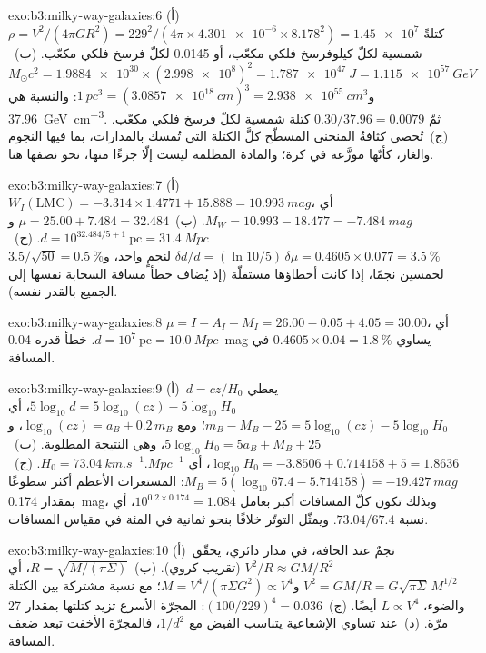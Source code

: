 \begin{solution}{exo:b3:milky-way-galaxies:6}
(أ)~$\rho = V^2/(4\pi GR^2) = 229^2/(4\pi\times\num{4.301e-6}\times
8.178^2) = \num{1.45e7}$ كتلةً شمسية لكلّ كيلوفرسخ فلكي مكعّب، أو
\num{0.0145} لكلّ فرسخ فلكي مكعّب. (ب)~$M_\odot c^2 = \num{1.9884e30}\times
(\num{2.998e8})^2 = \qty{1.787e47}{J} = \qty{1.115e57}{GeV}$
و$\qty{1}{pc^3} = (\qty{3.0857e18}{cm})^3 = \qty{2.938e55}{cm^3}$: والنسبة هي
\qty{37.96}{GeV.cm^{-3}}. ثمّ $0.30/37.96 = \num{0.0079}$ كتلة شمسية
لكلّ فرسخ فلكي مكعّب. (ج)~تُحصي كثافةُ المنحنى المسطّح كلَّ الكتلة التي تُمسك
بالمدارات، بما فيها النجوم والغاز، كأنّها موزَّعة في كرة؛
والمادة المظلمة ليست إلّا جزءًا منها، نحو نصفها هنا.
\end{solution}

\begin{solution}{exo:b3:milky-way-galaxies:7}
(أ)~$W_I(\mathrm{LMC}) = -3.314\times1.4771 + 15.888 = \qty{10.993}{mag}$،
أي $M_W = 10.993 - 18.477 = \qty{-7.484}{mag}$. (ب)~$\mu = 25.00 + 7.484 =
32.484$ و$d = 10^{32.484/5 + 1}~\mathrm{pc} = \qty{31.4}{Mpc}$.
(ج)~$\delta d/d = (\ln 10/5)\,\delta\mu = 0.4605\times0.077 =
\qty{3.5}{\percent}$ لنجمٍ واحد، و$3.5/\sqrt{50} = \qty{0.5}{\percent}$
لخمسين نجمًا، إذا كانت أخطاؤها مستقلّة (إذ يُضاف خطأ مسافة السحابة نفسها
إلى الجميع بالقدر نفسه).
\end{solution}

\begin{solution}{exo:b3:milky-way-galaxies:8}
$\mu = I - A_I - M_I = 26.00 - 0.05 + 4.05 = 30.00$، أي $d =
10^{7}~\mathrm{pc} = \qty{10.0}{Mpc}$. خطأ قدره \qty{0.04}{mag} يساوي
$0.4605\times0.04 = \qty{1.8}{\percent}$ في المسافة.
\end{solution}

\begin{solution}{exo:b3:milky-way-galaxies:9}
(أ)~$d = cz/H_0$ يعطي $5\log_{10}d = 5\log_{10}(cz) - 5\log_{10}H_0$،
أي $m_B - M_B - 25 = 5\log_{10}(cz) - 5\log_{10}H_0$؛ ومع
$\log_{10}(cz) = a_B + 0.2\,m_B$، و$5\log_{10}H_0 = 5a_B + M_B + 25$، وهي
النتيجة المطلوبة. (ب)~$\log_{10}H_0 = -3.8506 + 0.714158 + 5 = 1.8636$، أي
$H_0 = \qty{73.04}{km.s^{-1}.Mpc^{-1}}$. (ج)~$M_B = 5(\log_{10}67.4 -
5.714158) = \qty{-19.427}{mag}$: المستعرات الأعظم أكثر سطوعًا بمقدار \qty{0.174}{mag}،
وبذلك تكون كلّ المسافات أكبر بعامل $10^{0.2\times0.174} = 1.084$، أي
نسبة $73.04/67.4$. ويمثّل التوتّر خلافًا بنحو ثمانية في المئة في
مقياس المسافات.
\end{solution}

\begin{solution}{exo:b3:milky-way-galaxies:10}
(أ)~نجمٌ عند الحافة، في مدار دائري، يحقّق $V^2/R \approx GM/R^2$
(تقريب كروي). (ب)~$R = \sqrt{M/(\pi\Sigma)}$، أي $V^2 =
GM/R = G\sqrt{\pi\Sigma}\,M^{1/2}$ و$M = V^4/(\pi\Sigma G^2) \propto
V^4$؛ مع نسبة مشتركة بين الكتلة والضوء، $L \propto V^4$ أيضًا.
(ج)~$(100/229)^4 = \num{0.036}$: المجرّة الأسرع تزيد كتلتها
بمقدار 27 مرّة. (د)~عند تساوي الإشعاعية يتناسب الفيض مع $1/d^2$، فالمجرّة الأخفت
تبعد ضعف المسافة.
\end{solution}

